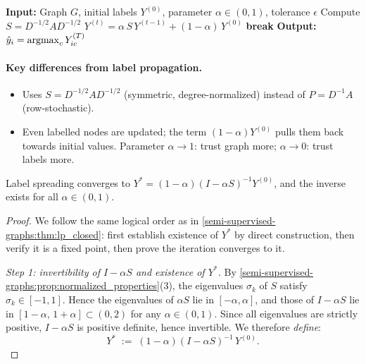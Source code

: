 \begin{notechapter}
\begin{algorithm}[H]
\caption{Label spreading (Zhou et al., 2004)}
\begin{algorithmic}[1]
\State \textbf{Input:} Graph $G$, initial labels $Y^{(0)}$, parameter
      $\alpha \in (0,1)$, tolerance $\epsilon$
\State Compute $S = D^{-1/2}AD^{-1/2}$
    \State $Y^{(t)} = \alpha\, S\, Y^{(t-1)} + (1-\alpha)\, Y^{(0)}$
     \textbf{break} \EndIf
\EndFor
\State \textbf{Output:} $\hat{y}_i = \operatorname*{argmax}_c Y_{ic}^{(T)}$
\end{algorithmic}
\end{algorithm}

\paragraph{Key differences from label propagation.}
\begin{itemize}
    \item Uses $S = D^{-1/2}AD^{-1/2}$ (symmetric, degree-normalized)
    instead of $P = D^{-1}A$ (row-stochastic).
    \item Even labelled nodes are updated; the term $(1{-}\alpha)Y^{(0)}$
    pulls them back towards initial values. Parameter $\alpha \to 1$:
    trust graph more; $\alpha \to 0$: trust labels more.
\end{itemize}

\begin{theorem}
\label{semi-supervised-graphs:thm:ls_closed}
Label spreading converges to $Y^* = (1-\alpha)(I - \alpha S)^{-1}Y^{(0)}$, and
the inverse exists for all $\alpha \in (0,1)$.
\end{theorem}

\begin{proof}
We follow the same logical order as in \cref{semi-supervised-graphs:thm:lp_closed}: first
establish existence of $Y^*$ by direct construction, then verify it is a fixed
point, then prove the iteration converges to it.
\vspace{0.5em}

\emph{Step 1: invertibility of $I - \alpha S$ and existence of $Y^*$.}
By \cref{semi-supervised-graphs:prop:normalized_properties}(3), the eigenvalues $\sigma_k$
of $S$ satisfy $\sigma_k \in [-1, 1]$. Hence the eigenvalues of $\alpha S$ lie
in $[-\alpha, \alpha]$, and those of $I - \alpha S$ lie in
$[1-\alpha,\, 1+\alpha] \subset (0, 2)$ for any $\alpha \in (0,1)$. Since all
eigenvalues are strictly positive, $I - \alpha S$ is positive definite, hence
invertible. We therefore \emph{define}:
\[
  Y^* \;:=\; (1-\alpha)(I - \alpha S)^{-1}\,Y^{(0)}.
\]


\end{proof}
\end{notechapter}
